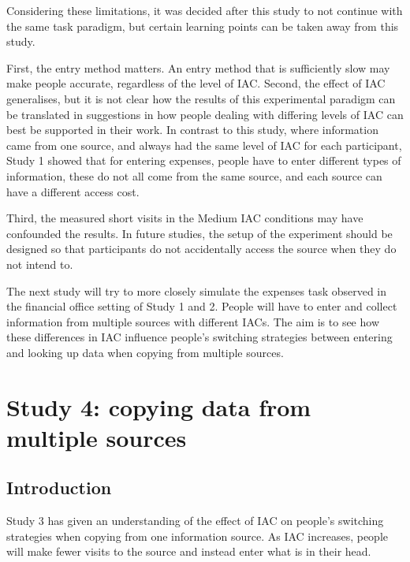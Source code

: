 \documentclass[11pt,oneside]{report}
\begin{document}
\begin{table}
Considering these limitations, it was decided after this study to not continue with the same task paradigm, but certain learning points can be taken away from this study.  

First, the entry method matters. An entry method that is sufficiently slow may make people accurate, regardless of the level of IAC. 
Second, the effect of IAC generalises, but it is not clear how the results of this experimental paradigm can be translated in suggestions in how people dealing with differing levels of IAC can best be supported in their work. In contrast to this study, where information came from one source, and always had the same level of IAC for each participant, Study 1 showed that for entering expenses, people have to enter different types of information, these do not all come from the same source, and each source can have a different access cost.

Third, the measured short visits in the Medium IAC conditions may have confounded the results. In future studies, the setup of the experiment should be designed so that participants do not accidentally access the source when they do not intend to.

The next study will try to more closely simulate the expenses task observed in the financial office setting of Study 1 and 2. People will have to enter and collect information from multiple sources with different IACs. The aim is to see how these differences in IAC influence people's switching strategies between entering and looking up data when copying from multiple sources. 



\section{Study 4: copying data from multiple sources}
 
\subsection{Introduction}
Study 3 has given an understanding of the effect of IAC on people's switching strategies when copying from one information source. As IAC increases, people will make fewer visits to the source and instead enter what is in their head. 


\end{table}
\end{document}
